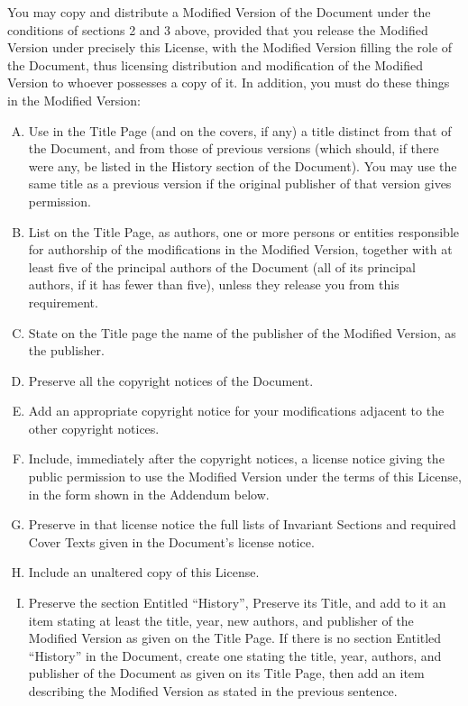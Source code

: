 You may copy and distribute a Modified Version of the Document
under the conditions of sections 2 and 3 above, provided that
you release the Modified Version under precisely this License,
with the Modified Version filling the role of the Document,
thus licensing distribution and modification of the Modified
Version to whoever possesses a copy of it. In addition,
you must do these things in the Modified Version:
\begin{enumerate}[A.]
\item    Use in the Title Page (and on the covers, if any)
a title distinct from that of the Document, and from those of
previous versions (which should, if there were any, be listed
in the History section of the Document). You may use the same
title as a previous version if the original publisher of that
version gives permission.

\item    List on the Title Page, as authors, one or more
persons or entities responsible for authorship of the
modifications in the Modified Version, together with at least
five of the principal authors of the Document (all of its
principal authors, if it has fewer than five), unless they
release you from this requirement.

\item    State on the Title page the name of the publisher of the Modified Version, as the publisher.

\item    Preserve all the copyright notices of the Document.

\item    Add an appropriate copyright notice for your
modifications adjacent to the other copyright notices.

\item    Include, immediately after the copyright notices,
a license notice giving the public permission to use the
Modified Version under the terms of this License, in the form
shown in the Addendum below.

\item    Preserve in that license notice the full lists of
Invariant Sections and required Cover Texts given in the
Document’s license notice.

\item    Include an unaltered copy of this License.

\item    Preserve the section Entitled “History”, Preserve
its Title, and add to it an item stating at least the title,
year, new authors, and publisher of the Modified Version
as given on the Title Page. If there is no section Entitled
“History” in the Document, create one stating the title,
year, authors, and publisher of the Document as given on its
Title Page, then add an item describing the Modified Version
as stated in the previous sentence.


\end{enumerate}
